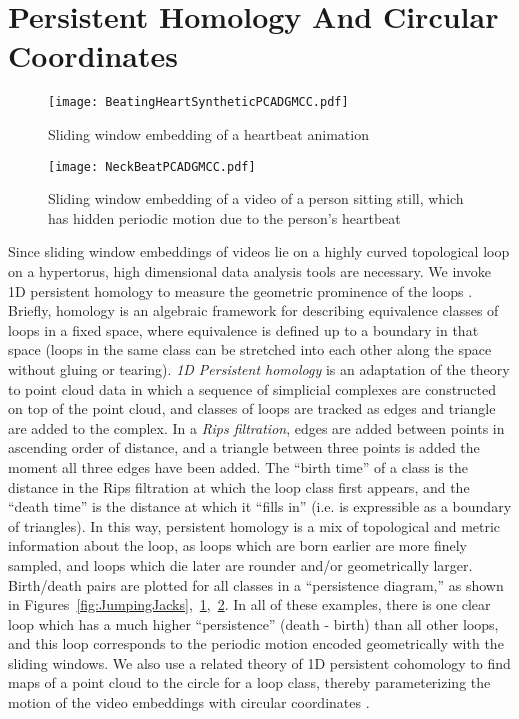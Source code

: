 \documentclass[a4paper,UKenglish]{lipics-v2016}
\begin{document}
\section{Persistent Homology And Circular Coordinates}



\begin{figure}[]
	\centering
	\texttt{[image: BeatingHeartSyntheticPCADGMCC.pdf]}
	\caption{Sliding window embedding of a heartbeat animation}
	\label{fig:BeatingHeart}
\end{figure}



\begin{figure}[]
	\centering
	\texttt{[image: NeckBeatPCADGMCC.pdf]}
	\caption{Sliding window embedding of a video of a person sitting still, which has hidden periodic motion due to the person's heartbeat}
	\label{fig:NeckBeating}
\end{figure}


Since sliding window embeddings of videos lie on a highly curved topological loop on a hypertorus, high dimensional data analysis tools are necessary.  We invoke 1D persistent homology to measure the geometric prominence of the loops \cite{edelsbrunner2010computational}.  Briefly, homology is an algebraic framework for describing equivalence classes of loops in a fixed space, where equivalence is defined up to a boundary in that space (loops in the same class can be stretched into each other along the space without gluing or tearing).  {\em 1D Persistent homology} is an adaptation of the theory to point cloud data in which a sequence of simplicial complexes are constructed on top of the point cloud, and classes of loops are tracked as edges and triangle are added to the complex.  In a {\em Rips filtration}, edges are added between points in ascending order of distance, and a triangle between three points is added the moment all three edges have been added.  The ``birth time'' of a class is the distance in the Rips filtration at which the loop class first appears, and the ``death time'' is the distance at which it ``fills in'' (i.e. is expressible as a boundary of triangles).  In this way, persistent homology is a mix of topological and metric information about the loop, as loops which are born earlier are more finely sampled, and loops which die later are rounder and/or geometrically larger.  Birth/death pairs are plotted for all classes in a ``persistence diagram,'' as shown in Figures~\ref{fig:JumpingJacks},~\ref{fig:BeatingHeart},~\ref{fig:NeckBeating}.  In all of these examples, there is one clear loop which has a much higher ``persistence'' (death - birth) than all other loops, and this loop corresponds to the periodic motion encoded geometrically with the sliding windows.  We also use a related theory of 1D persistent cohomology to find maps of a point cloud to the circle for a loop class, thereby parameterizing the motion of the video embeddings with circular coordinates \cite{de2011persistent}.  
\end{document}
